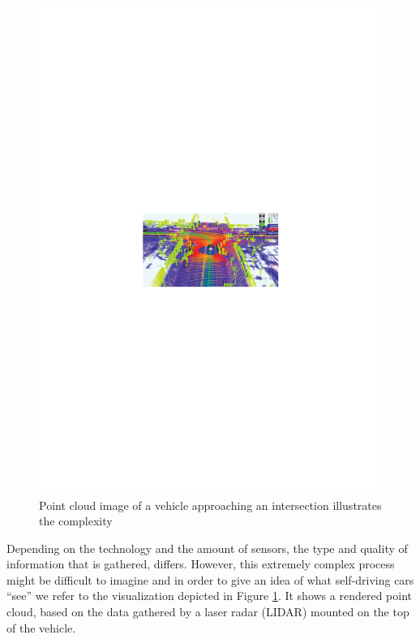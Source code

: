\begin{figure}
\centering
\includegraphics[width=1\linewidth]{Figures/pointCloud.pdf}
\caption{Point cloud image of a vehicle approaching an intersection illustrates the complexity \cite{EarthImagingJournalEIJ:RemoteSensingSatelliteImages2012}}
\label{fig:PointCloudImageGoogle}
\end{figure}

Depending on the technology and the amount of sensors, the type and quality of information that is gathered, differs. However, this extremely complex process might be difficult to imagine and in order to give an idea of what self-driving cars \enquote{see} we refer to the visualization depicted in Figure \ref{fig:PointCloudImageGoogle}. It shows a rendered point cloud, based on the data gathered by a laser radar (LIDAR) mounted on the top of the vehicle. 


